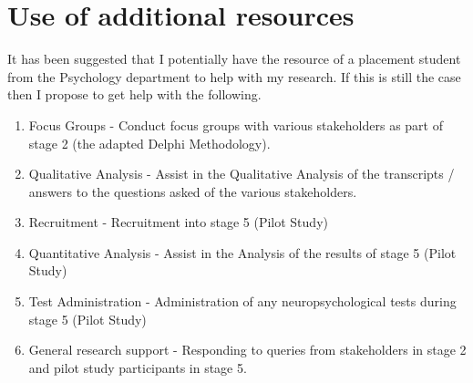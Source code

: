 \documentclass[11pt]{article}
\begin{document}
\section*{Use of additional resources}
It has been suggested that I potentially have the resource of a placement student from the Psychology department to help with my research. If this is still the case then I propose to get help with the following.

\begin{enumerate}
	\item Focus Groups - Conduct focus groups with various stakeholders as part of stage 2 (the adapted Delphi Methodology).
	\item Qualitative Analysis - Assist in the Qualitative Analysis of the transcripts / answers to the questions asked of the various stakeholders. 
	\item Recruitment - Recruitment into stage 5 (Pilot Study)
	\item Quantitative Analysis - Assist in the Analysis of the results of stage 5 (Pilot Study)
	\item Test Administration - Administration of any neuropsychological tests during stage 5 (Pilot Study)
	\item General research support - Responding to queries from stakeholders in stage 2 and pilot study participants in stage 5.
\end{enumerate}
\end{document}
